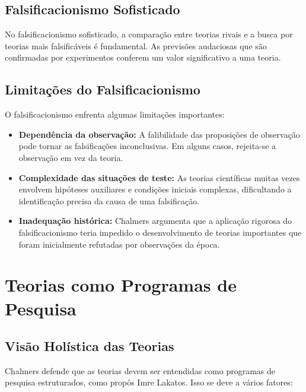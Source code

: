 \documentclass{article} %
\begin{document}
\subsection{Falsificacionismo Sofisticado}

No falsificacionismo sofisticado, a comparação entre teorias rivais e a busca por teorias mais falsificáveis é fundamental. As previsões audaciosas que são confirmadas por experimentos conferem um valor significativo a uma teoria.

\subsection{Limitações do Falsificacionismo}

O falsificacionismo enfrenta algumas limitações importantes:

\begin{itemize}
    \item \textbf{Dependência da observação:} A falibilidade das proposições de observação pode tornar as falsificações inconclusivas. Em alguns casos, rejeita-se a observação em vez da teoria.
    
    \item \textbf{Complexidade das situações de teste:} As teorias científicas muitas vezes envolvem hipóteses auxiliares e condições iniciais complexas, dificultando a identificação precisa da causa de uma falsificação.
    
    \item \textbf{Inadequação histórica:} Chalmers argumenta que a aplicação rigorosa do falsificacionismo teria impedido o desenvolvimento de teorias importantes que foram inicialmente refutadas por observações da época.
\end{itemize}

\newpage

\section{Teorias como Programas de Pesquisa}

\subsection{Visão Holística das Teorias}

Chalmers defende que as teorias devem ser entendidas como programas de pesquisa estruturados, como propôs Imre Lakatos. Isso se deve a vários fatores:
\end{document}
